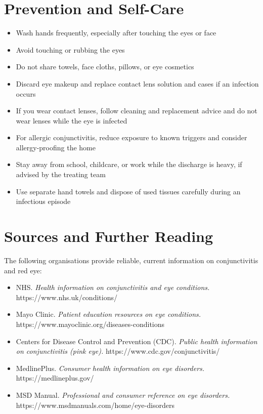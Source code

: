 \section*{Prevention and Self-Care}
\begin{itemize}
    \item Wash hands frequently, especially after touching the eyes or face
    \item Avoid touching or rubbing the eyes
    \item Do not share towels, face cloths, pillows, or eye cosmetics
    \item Discard eye makeup and replace contact lens solution and cases if an infection occurs
    \item If you wear contact lenses, follow cleaning and replacement advice and do not wear lenses while the eye is infected
    \item For allergic conjunctivitis, reduce exposure to known triggers and consider allergy-proofing the home
    \item Stay away from school, childcare, or work while the discharge is heavy, if advised by the treating team
    \item Use separate hand towels and dispose of used tissues carefully during an infectious episode
\end{itemize}

\section*{Sources and Further Reading}
The following organisations provide reliable, current information on conjunctivitis and red eye:
\begin{itemize}
    \item NHS. \textit{Health information on conjunctivitis and eye conditions.} https://www.nhs.uk/conditions/
    \item Mayo Clinic. \textit{Patient education resources on eye conditions.} https://www.mayoclinic.org/diseases-conditions
    \item Centers for Disease Control and Prevention (CDC). \textit{Public health information on conjunctivitis (pink eye).} https://www.cdc.gov/conjunctivitis/
    \item MedlinePlus. \textit{Consumer health information on eye disorders.} https://medlineplus.gov/
    \item MSD Manual. \textit{Professional and consumer reference on eye disorders.} https://www.msdmanuals.com/home/eye-disorders
\end{itemize}
